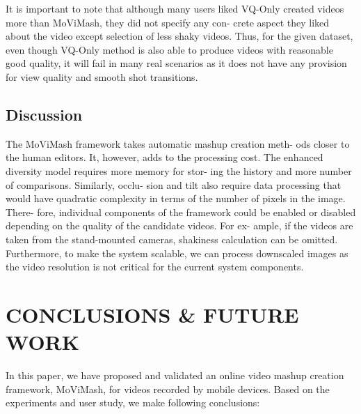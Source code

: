 \documentclass{new}
\begin{document}
It is important to note that although many users liked VQ-Only
created videos more than MoViMash, they did not specify any con-
crete aspect they liked about the video except selection of less
shaky videos. Thus, for the given dataset, even though VQ-Only
method is also able to produce videos with reasonable good quality,
it will fail in many real scenarios as it does not have any provision
for view quality and smooth shot transitions.

\subsection{Discussion}
The MoViMash framework takes automatic mashup creation meth-
ods closer to the human editors. It, however, adds to the processing
cost. The enhanced diversity model requires more memory for stor-
ing the history and more number of comparisons. Similarly, occlu-
sion and tilt also require data processing that would have quadratic
complexity in terms of the number of pixels in the image. There-
fore, individual components of the framework could be enabled or
disabled depending on the quality of the candidate videos. For ex-
ample, if the videos are taken from the stand-mounted cameras,
shakiness calculation can be omitted. Furthermore, to make the
system scalable, we can process downscaled images as the video
resolution is not critical for the current system components.

\section{CONCLUSIONS \& FUTURE WORK}
In this paper, we have proposed and validated an online video
mashup creation framework, MoViMash, for videos recorded by
mobile devices. Based on the experiments and user study, we make
following conclusions:
\end{document}
